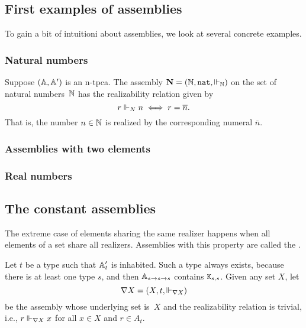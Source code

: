 \subsection{First examples of assemblies}
\label{sec:examples-assemblies}

To gain a bit of intuitioni about assemblies, we look at several concrete examples.

\subsubsection{Natural numbers}
\label{sec:asm-natural-numbers}

Suppose $(\mathbb{A}, \mathbb{A}')$ is an n-tpca. The assembly $\mathbf{N} = (\mathbb{N}, \mathtt{nat}, {\Vdash_{\mathbb{N}}})$ on the set of natural numbers~$\mathbb{N}$ has the realizability relation given by
%
\begin{equation*}
  r \Vdash_N n \iff
  r = \overline{n}.
\end{equation*}
%
That is, the number $n \in \mathbb{N}$ is realized by the corresponding numeral $\overline{n}$.



\subsubsection{Assemblies with two elements}
\label{sec:asm-two-element}


\subsubsection{Real numbers}
\label{sec:asm-real-numbers}


\subsection{The constant assemblies}
\label{sec:nabla}

The extreme case of elements sharing the same realizer happens when
all elements of a set share all realizers. Assemblies with this
property are called the .

Let $t$ be a type such that $\mathbb{A}'_{t}$ is inhabited. Such a type
always exists, because there is at least one type $s$, and then
$\mathbb{A}_{s \to s \to s}$ contains $\mathtt{K}_{s,s}$. Given any set $X$, let
%
\begin{equation*}
  \nabla X = (X, t, {\Vdash_{\nabla X}})
\end{equation*}
%
be the assembly whose underlying set is~$X$ and the realizability relation is trivial, i.e., $r \Vdash_{\nabla X} x$ for all $x \in X$ and $r \in A_t$.

